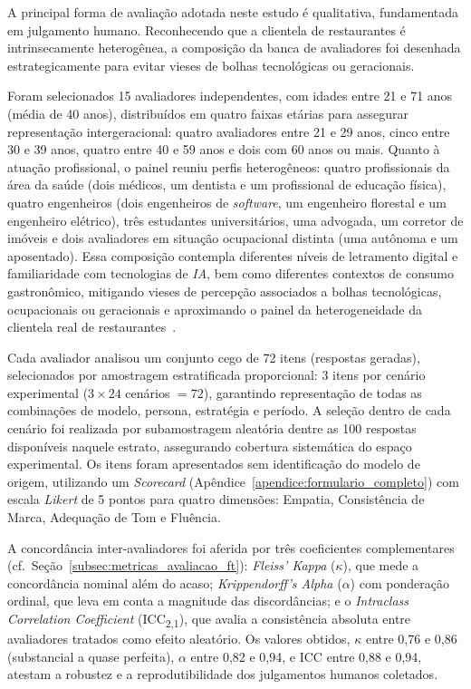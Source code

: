 \documentclass[12pt, a4paper]{article}
\numberwithin{equation}{section}
\begin{document}
A principal forma de avaliação adotada neste estudo é qualitativa, fundamentada em julgamento humano. Reconhecendo que a clientela de restaurantes é intrinsecamente heterogênea, a composição da banca de avaliadores foi desenhada estrategicamente para evitar vieses de bolhas tecnológicas ou geracionais.

Foram selecionados 15 avaliadores independentes, com idades entre 21 e 71 anos (média de 40 anos), distribuídos em quatro faixas etárias para assegurar representação intergeracional: quatro avaliadores entre 21 e 29 anos, cinco entre 30 e 39 anos, quatro entre 40 e 59 anos e dois com 60 anos ou mais. Quanto à atuação profissional, o painel reuniu perfis heterogêneos: quatro profissionais da área da saúde (dois médicos, um dentista e um profissional de educação física), quatro engenheiros (dois engenheiros de \textit{software}, um engenheiro florestal e um engenheiro elétrico), três estudantes universitários, uma advogada, um corretor de imóveis e dois avaliadores em situação ocupacional distinta (uma autônoma e um aposentado). Essa composição contempla diferentes níveis de letramento digital e familiaridade com tecnologias de \textit{IA}, bem como diferentes contextos de consumo gastronômico, mitigando vieses de percepção associados a bolhas tecnológicas, ocupacionais ou geracionais e aproximando o painel da heterogeneidade da clientela real de restaurantes~\cite{howcroft2021}.

Cada avaliador analisou um conjunto cego de 72 itens (respostas geradas), selecionados por amostragem estratificada proporcional: 3 itens por cenário experimental ($3 \times 24$ cenários $= 72$), garantindo representação de todas as combinações de modelo, persona, estratégia e período. A seleção dentro de cada cenário foi realizada por subamostragem aleatória dentre as 100 respostas disponíveis naquele estrato, assegurando cobertura sistemática do espaço experimental. Os itens foram apresentados sem identificação do modelo de origem, utilizando um \textit{Scorecard} (Apêndice~\ref{apendice:formulario_completo}) com escala \textit{Likert} de 5 pontos para quatro dimensões: Empatia, Consistência de Marca, Adequação de Tom e Fluência.

A concordância inter-avaliadores foi aferida por três coeficientes complementares (cf.\ Seção~\ref{subsec:metricas_avaliacao_ft}): \textit{Fleiss' Kappa} ($\kappa$), que mede a concordância nominal além do acaso; \textit{Krippendorff's Alpha} ($\alpha$) com ponderação ordinal, que leva em conta a magnitude das discordâncias; e o \textit{Intraclass Correlation Coefficient} (ICC\textsubscript{2,1}), que avalia a consistência absoluta entre avaliadores tratados como efeito aleatório. Os valores obtidos, $\kappa$ entre 0,76 e 0,86 (substancial a quase perfeita), $\alpha$ entre 0,82 e 0,94, e ICC entre 0,88 e 0,94, atestam a robustez e a reprodutibilidade dos julgamentos humanos coletados.
\end{document}
